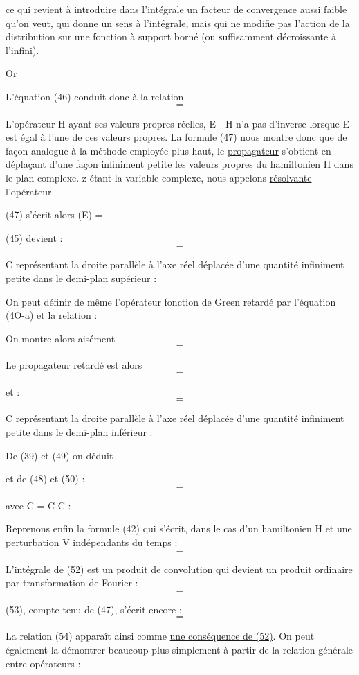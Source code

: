 ce qui revient à introduire dans l'intégrale un facteur de convergence aussi
faible qu'on veut, qui donne un sens à l'intégrale, mais qui ne modifie pas
l'action de la distribution sur une fonction à support borné (ou suffisamment
décroissante à l'infini).

Or

L'équation (46) conduit donc à la relation
\[
\tag{47}=
\]

L'opérateur H ayant ses valeurs propres réelles, E - H n'a pas d'inverse
lorsque E est égal à l'une de ces valeurs propres. La formule (47) nous
montre donc que de façon analogue à la méthode employée plus haut, le
\ul{propagateur} s'obtient en déplaçant d'une façon infiniment petite les valeurs
propres du hamiltonien H dans le plan complexe. z étant la variable complexe,
nous appelons \ul{résolvante} l'opérateur

(47) s'écrit alors (E) = 

(45) devient :
\[
\tag{48}=
\]

C représentant la droite parallèle à l'axe réel déplacée d'une quantité
infiniment petite dans le demi-plan supérieur :

On peut définir de même l'opérateur fonction de Green retardé  par
l'équation (4O-a) et la relation :

On montre alors aisément
\[
\tag{49}=
\]

Le propagateur retardé est alors
\[
=
\]

et :
\[
\tag{50}=
\]

C représentant la droite parallèle à l'axe réel déplacée d'une quantité
infiniment petite dans le demi-plan inférieur :

De (39) et (49) on déduit

et de (48) et (50) :
\[
\tag{51}=
\]

avec C = C  C :

Reprenons enfin la formule (42) qui s'écrit, dans le cas d'un
hamiltonien H et une perturbation V \ul{indépendants du temps} :
\[
\tag{52}=
\]

L'intégrale de (52) est un produit de convolution qui devient un produit
ordinaire par transformation de Fourier :
\[
\tag{53}=
\]

(53), compte tenu de (47), s'écrit encore :
\[
\tag{54}=
\]

La relation (54) apparaît ainsi comme \ul{une conséquence de (52)}. On peut
également la démontrer beaucoup plus simplement à partir de la relation
générale entre opérateurs :
